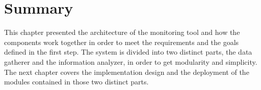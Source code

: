 \section{Summary}
This chapter presented the architecture of the monitoring tool and how the components work together in order to meet the requirements and the goals defined in the first step. The system is divided into two distinct parts, the data gatherer and the information analyzer, in order to get modularity and simplicity. The next chapter covers the implementation design and the deployment of the modules contained in those two distinct parts.




